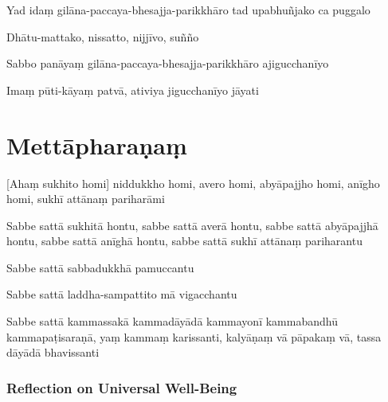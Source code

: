 
Yad idaṃ gilāna-paccaya-bhesajja-parikkhāro tad upabhuñjako ca puggalo


Dhātu-mattako, nissatto, nijjīvo, suñño


Sabbo panāyaṃ gilāna-paccaya-bhesajja-parikkhāro ajigucchanīyo


Imaṃ pūti-kāyaṃ patvā, ativiya jigucchanīyo jāyati


\section{Mettāpharaṇaṃ}

\begin{leader}
\end{leader}


[Ahaṃ sukhito homi] niddukkho homi, avero homi, abyāpajjho homi, anīgho homi,
sukhī attānaṃ pariharāmi

Sabbe sattā sukhitā hontu, sabbe sattā averā hontu, sabbe sattā abyāpajjhā
hontu, sabbe sattā anīghā hontu, sabbe sattā sukhī attānaṃ pariharantu

Sabbe sattā sabbadukkhā pamuccantu

Sabbe sattā laddha-sampattito mā vigacchantu

Sabbe sattā kammassakā kammadāyādā kammayonī kammabandhū kammapaṭisaraṇā,
yaṃ kammaṃ karissanti, kalyāṇaṃ vā pāpakaṃ vā, tassa dāyādā bhavissanti


\subsubsection{Reflection on Universal Well-Being}

\begin{leader}
\end{leader}

